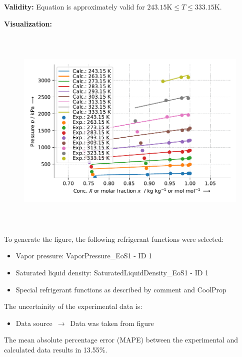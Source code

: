 \textbf{Validity:}
\newline
Equation is approximately valid for $243.15 \si{\kelvin} \leq T \leq 333.15 \si{\kelvin}$.
\newline

\textbf{Visualization:}
%
\begin{figure}[!htp]
{\noindent\includegraphics[height=10cm, keepaspectratio]{figs/abs/abs_R-125_lubricant_POE_Heil_1.pdf}}
\end{figure}
%

To generate the figure, the following refrigerant functions were selected:
\begin{itemize}
\item Vapor pressure: VaporPressure\_EoS1 - ID 1
\item Saturated liquid density: SaturatedLiquidDensity\_EoS1 - ID 1
\item Special refrigerant functions as described by comment and CoolProp
\end{itemize}

The uncertainity of the experimental data is:
\begin{itemize}
\item Data source $\,\to\,$ Data was taken from figure
\end{itemize}

The mean absolute percentage error (MAPE) between the experimental and calculated data results in 13.55\%.
\FloatBarrier
\newpage
